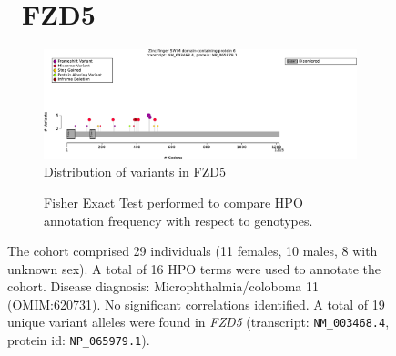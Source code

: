 \begin{figure}[htbp]
\section*{ FZD5}
\centering
\begin{subfigure}[b]{0.95\textwidth}
\centering
\includegraphics[width=\textwidth]{ img/FZD5_protein_diagram.pdf} 
\captionsetup{justification=raggedright,singlelinecheck=false}
\caption{Distribution of variants in FZD5}
\end{subfigure}

\vspace{2em}

\begin{subfigure}[b]{0.95\textwidth}
\centering
{}
\captionsetup{justification=raggedright,singlelinecheck=false}
\caption{Fisher Exact Test performed to compare HPO annotation frequency with respect to genotypes. }
\end{subfigure}

\vspace{2em}

\caption{ The cohort comprised 29 individuals (11 females, 10 males, 8 with unknown sex). A total of 16 HPO terms were used to annotate the cohort. Disease diagnosis: Microphthalmia/coloboma 11 (OMIM:620731). No significant correlations identified. A total of 19 unique variant alleles were found in \textit{FZD5} (transcript: \texttt{NM\_003468.4}, protein id: \texttt{NP\_065979.1}).}
\end{figure}
